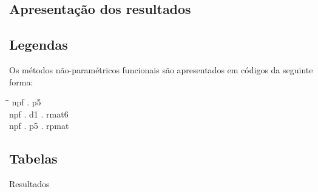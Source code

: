 \documentclass[
	12pt,				%
	openright,			%
	oneside,			%
	a4paper,			%
	english,			%
	brazil				%
	]{dissertacao-ufrgs-abntex2}
\begin{document}
\begin{apendicesenv}
%
\partapendices
%



\chapter{Apresentação dos resultados} \label{tabelas-resultados}


\section{Legendas} \label{apend:legendas}

Os métodos não-paramétricos funcionais são apresentados em códigos da seguinte forma:
\begin{tabbing}
\hspace{1cm}\=\hspace{0.5cm}\=\hspace{1cm}\=\hspace{0.5cm}\=\kill
npf \> . \> p5 \>  \> \\ 
npf \> . \> d1 \> . \> rmat6 \\ 
npf \> . \> p5  \> . \> rpmat
\end{tabbing} 


\section{Tabelas} \label{apend:tabelas}

Resultados


%







%
%
%


\end{apendicesenv}
\end{document}
